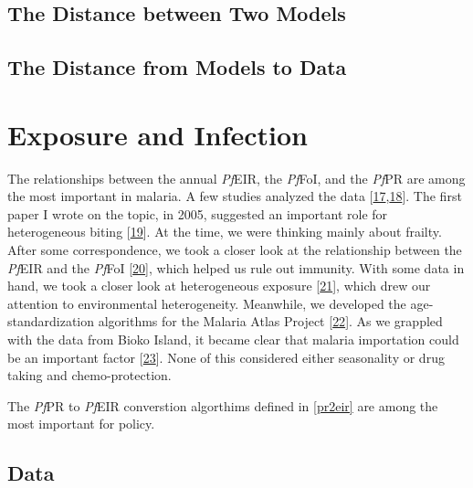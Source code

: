 \documentclass[
]{book}
\begin{document}
\hypertarget{the-distance-between-two-models}{%
\section{The Distance between Two Models}\label{the-distance-between-two-models}}

\hypertarget{the-distance-from-models-to-data}{%
\section{The Distance from Models to Data}\label{the-distance-from-models-to-data}}

\hypertarget{exposure-and-infection}{%
\chapter{Exposure and Infection}\label{exposure-and-infection}}

The relationships between the annual \emph{Pf}EIR, the \emph{Pf}FoI, and the \emph{Pf}PR are among the most important in malaria. A few studies analyzed the data {[}\protect\hyperlink{ref-BeierJC1999ShortReport}{17},\protect\hyperlink{ref-HaySI2005UrbanizationMalaria}{18}{]}. The first paper I wrote on the topic, in 2005, suggested an important role for heterogeneous biting {[}\protect\hyperlink{ref-SmithDL2005_EIRvPR}{19}{]}. At the time, we were thinking mainly about frailty. After some correspondence, we took a closer look at the relationship between the \emph{Pf}EIR and the \emph{Pf}FoI {[}\protect\hyperlink{ref-SmithDL2010_InefficientTransmission}{20}{]}, which helped us rule out immunity. With some data in hand, we took a closer look at heterogeneous exposure {[}\protect\hyperlink{ref-CooperL2019ParetoRules}{21}{]}, which drew our attention to environmental heterogeneity. Meanwhile, we developed the age-standardization algorithms for the Malaria Atlas Project {[}\protect\hyperlink{ref-SmithDL2007_StandardizingPfPR}{22}{]}. As we grappled with the data from Bioko Island, it became clear that malaria importation could be an important factor {[}\protect\hyperlink{ref-GuerraCA2019HumanMobility}{23}{]}. None of this considered either seasonality or drug taking and chemo-protection.

The \emph{Pf}PR to \emph{Pf}EIR converstion algorthims defined in \ref{pr2eir} are among the most important for policy.

\hypertarget{data}{%
\section{Data}\label{data}}
\end{document}
